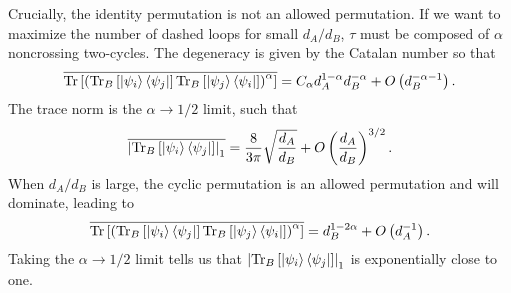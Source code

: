\documentclass[a4paper,11pt]{article}
\newcommand{\Tr}{\text{Tr}}
\newcommand*{\JKF}[1]{\textcolor{blue}{[JKF: #1]}}
\newcommand*{\SR}[1]{\textcolor{magenta}{[SR: \textsf{#1}]}}
\begin{document}
Crucially, the identity permutation is not an allowed permutation. If we want to maximize the number of dashed loops for small $d_A/d_B$, $\tau$ must be composed of $\alpha$ noncrossing two-cycles. The degeneracy is given by the Catalan number so that
\begin{align}
    \overline{\Tr\left[ \left(\Tr_B\left[\ket{\psi_i}\bra{\psi_j} \right]\Tr_B\left[\ket{\psi_j}\bra{\psi_i} \right]\right)^{\alpha}\right]} = C_{\alpha} d_A^{1-\alpha}d_B^{-\alpha} + O\left(d_B^{-\alpha -1} \right).
\end{align}
The trace norm is the $\alpha \rightarrow 1/2$ limit, such that
\begin{align}
    \overline{\left|\Tr_B\left[\ket{\psi_i}\bra{\psi_j} \right] \right|_1} = \frac{8}{3\pi}\sqrt{\frac{d_A}{d_B}} + O\left(\frac{d_A}{d_B} \right)^{3/2}.
\end{align}
When $d_A/d_B$ is large, the cyclic permutation is an allowed permutation and will dominate, leading to 
\begin{align}
    \overline{\Tr\left[ \left(\Tr_B\left[\ket{\psi_i}\bra{\psi_j} \right]\Tr_B\left[\ket{\psi_j}\bra{\psi_i} \right]\right)^{\alpha}\right]}= d_B^{1-2\alpha} + O\left(d_A^{-1} \right).
\end{align}
Taking the $\alpha \rightarrow 1/2$ limit tells us that $\left|\Tr_B\left[\ket{\psi_i}\bra{\psi_j} \right] \right|_1 $ is exponentially close to one. 
\end{document}
